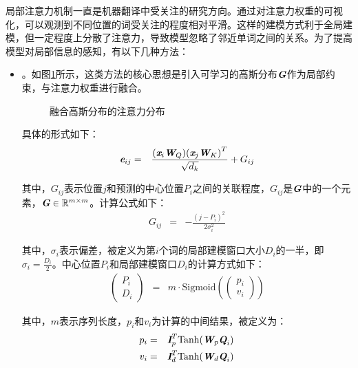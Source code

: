 \parinterval 局部注意力机制一直是机器翻译中受关注的研究方向。通过对注意力权重的可视化，可以观测到不同位置的词受关注的程度相对平滑。这样的建模方式利于全局建模，但一定程度上分散了注意力，导致模型忽略了邻近单词之间的关系。为了提高模型对局部信息的感知，有以下几种方法：

\begin{itemize}
\vspace{0.5em}
\item {\small{}}。如图\ref{fig:15-3}所示，这类方法的核心思想是引入可学习的高斯分布$\textbf{\em G}$作为局部约束，与注意力权重进行融合。

\begin{figure}[htp]
\centering

\caption{融合高斯分布的注意力分布}
\label{fig:15-3}
\end{figure}

\noindent 具体的形式如下：
\begin{eqnarray}
\textbf{\em e}_{ij} &=& \frac{(\textbf{\em x}_i \textbf{\em W}_Q){(\textbf{\em x}_j \textbf{\em W}_K)}^{T}}{\sqrt{d_k}} + G_{ij}
\label{eq:15-15}
\end{eqnarray}

\noindent 其中，$G_{ij}$表示位置$j$和预测的中心位置$P_i$之间的关联程度，$G_{ij}$是$\textbf{\em G}$中的一个元素，$\textbf{\em G} \in \mathbb{R}^{m\times m}$。计算公式如下：
\begin{eqnarray}
G_{ij} &=& - \frac{{(j - P_i)}^2}{2\sigma_i^2}
\label{eq:15-16}
\end{eqnarray}

\noindent 其中，$\sigma_i$表示偏差，被定义为第$i$个词的局部建模窗口大小$D_i$的一半，即$\sigma_i = \frac{D_i}{2}$。中心位置$P_i$和局部建模窗口$D_i$的计算方式如下：
\begin{eqnarray}
\begin{pmatrix} P_i \\ D_i \end{pmatrix} &=& m \cdot \textrm{Sigmoid}(\begin{pmatrix} p_i \\ v_i \end{pmatrix})
\label{eq:15-17}
\end{eqnarray}

\noindent 其中，$m$表示序列长度，$p_i$和$v_i$为计算的中间结果，被定义为：
\begin{eqnarray}
p_i &=& \textbf{\em I}_p^T\textrm{Tanh}(\textbf{\em W}_p\textbf{\em Q}_i) \\
v_i &=& \textbf{\em I}_d^T\textrm{Tanh}(\textbf{\em W}_d\textbf{\em Q}_i)
\label{eq:15-19}
\end{eqnarray}


\end{itemize}

